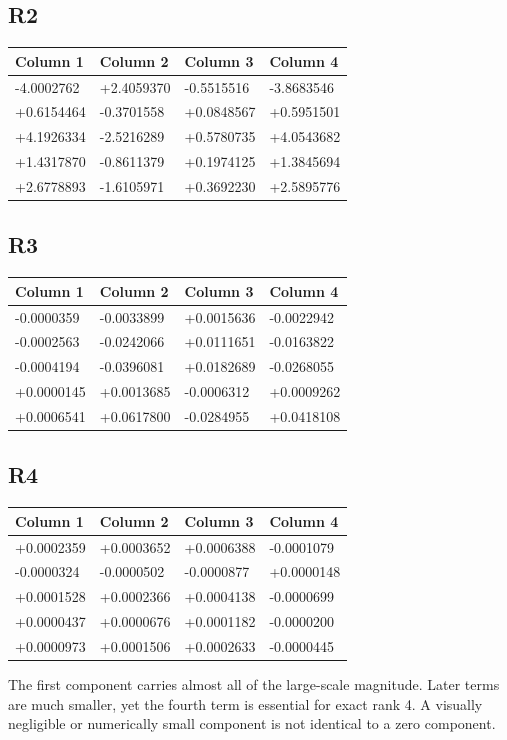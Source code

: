 \documentclass[a4paper,11pt]{article}
\begin{document}
\subsection*{R2}
\begin{center}\fontsize{8.5}{10.5}\selectfont\begin{tabular}{@{}llll@{}}\toprule
Column 1 & Column 2 & Column 3 & Column 4\\\midrule
-4.0002762 & +2.4059370 & -0.5515516 & -3.8683546\\
+0.6154464 & -0.3701558 & +0.0848567 & +0.5951501\\
+4.1926334 & -2.5216289 & +0.5780735 & +4.0543682\\
+1.4317870 & -0.8611379 & +0.1974125 & +1.3845694\\
+2.6778893 & -1.6105971 & +0.3692230 & +2.5895776\\
\bottomrule\end{tabular}\end{center}
\subsection*{R3}
\begin{center}\fontsize{8.5}{10.5}\selectfont\begin{tabular}{@{}llll@{}}\toprule
Column 1 & Column 2 & Column 3 & Column 4\\\midrule
-0.0000359 & -0.0033899 & +0.0015636 & -0.0022942\\
-0.0002563 & -0.0242066 & +0.0111651 & -0.0163822\\
-0.0004194 & -0.0396081 & +0.0182689 & -0.0268055\\
+0.0000145 & +0.0013685 & -0.0006312 & +0.0009262\\
+0.0006541 & +0.0617800 & -0.0284955 & +0.0418108\\
\bottomrule\end{tabular}\end{center}
\subsection*{R4}
\begin{center}\fontsize{8.5}{10.5}\selectfont\begin{tabular}{@{}llll@{}}\toprule
Column 1 & Column 2 & Column 3 & Column 4\\\midrule
+0.0002359 & +0.0003652 & +0.0006388 & -0.0001079\\
-0.0000324 & -0.0000502 & -0.0000877 & +0.0000148\\
+0.0001528 & +0.0002366 & +0.0004138 & -0.0000699\\
+0.0000437 & +0.0000676 & +0.0001182 & -0.0000200\\
+0.0000973 & +0.0001506 & +0.0002633 & -0.0000445\\
\bottomrule\end{tabular}\end{center}
The first component carries almost all of the large-scale magnitude. Later terms are much smaller, yet the fourth term is essential for exact rank 4. A visually negligible or numerically small component is not identical to a zero component.
\end{document}
